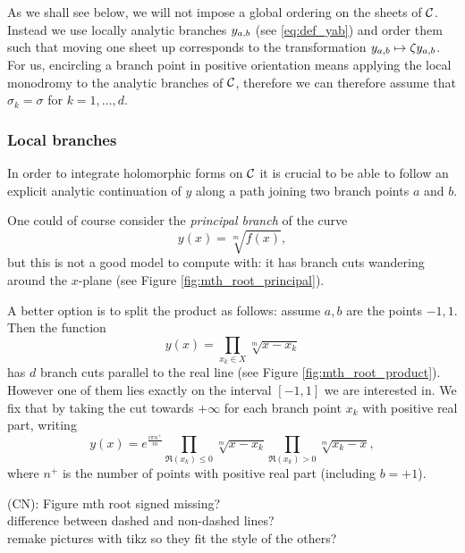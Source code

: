 \documentclass[main.tex]{subfiles}
\begin{document}
  As we shall see below, we
  will not impose a global ordering on the sheets of $\mathcal{C}$. Instead we use
  locally analytic branches $y_{a,b}$ (see \eqref{eq:def_yab}) and order them such that
  moving one sheet up corresponds to the transformation $y_{a,b} \mapsto
  \zeta y_{a,b}$. For us, encircling a branch point in positive orientation means
  applying the local monodromy to the analytic branches of $\mathcal{C}$, therefore we
  can therefore assume that $\sigma_k = \sigma$ for $k = 1,\dots,d$.

  \subsubsection{Local branches}

  In order to integrate holomorphic forms on $\mathcal{C}$
  it is crucial to be able to follow an explicit analytic continuation of $y$ along a
  path joining two branch points $a$ and $b$.

  One could of course consider the \emph{principal branch} of the curve
  \begin{equation*}
      y(x) = \sqrt[m]{f(x)},
  \end{equation*}
  but this is not a good model to compute with: it has branch cuts
  wandering around the $x$-plane (see Figure \ref{fig:mth_root_principal}).
  
  A better option is to split the product as follows:
  assume $a,b$ are the points $-1,1$. Then the function
  \begin{equation*}
      y(x) = \prod_{x_k\in X}\sqrt[m]{x-x_k}
  \end{equation*}
  has $d$ branch cuts parallel to the real line (see Figure \ref{fig:mth_root_product}).
  However one of them lies exactly on the interval $[-1,1]$ we are interested in. We fix
  that by taking the cut towards $+\infty$ for each branch point $x_k$ with positive real part, writing
  \begin{equation*}
      y(x) = e^{\frac{iπn^+}m}\prod_{\Re(x_k)\leq0}\sqrt[m]{x-x_k} \prod_{\Re(x_k)>0}\sqrt[m]{x_k-x},
  \end{equation*}
  where $n^+$ is the number of points with positive real part (including $b=+1$).

  \todo (CN): Figure mth root signed missing? \\ difference between dashed and non-dashed lines? \\ remake pictures with tikz so they fit the style of the others?
  
\end{document}
